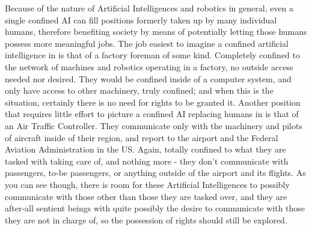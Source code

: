 Because of the nature of Artificial Intelligences and robotics in general, even a single confined AI can fill positions formerly taken up by many individual humans, therefore benefiting society by means of potentially letting those humans possess more meaningful jobs. The job easiest to imagine a confined artificial intelligence in is that of a factory foreman of some kind. Completely confined to the network of machines and robotics operating in a factory, no outside access needed nor desired. They would be confined inside of a computer system, and only have access to other machinery, truly confined; and when this is the situation, certainly there is no need for rights to be granted it. Another position that requires little effort to picture a confined AI replacing humans in is that of an Air Traffic Controller. They communicate only with the machinery and pilots of aircraft inside of their region, and report to the airport and the Federal Aviation Administration in the US. Again, totally confined to what they are tasked with taking care of, and nothing more - they don't communicate with passengers, to-be passengers, or anything outside of the airport and its flights. As you can see though, there is room for these Artificial Intelligences to possibly communicate with those other than those they are tasked over, and they are after-all sentient beings with quite possibly the desire to communicate with those they are not in charge of, so the possession of rights should still be explored.